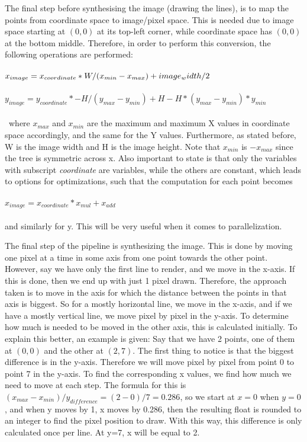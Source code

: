 The final step before synthesising the image (drawing the lines), is to map the points from coordinate space to image/pixel space. This is needed due to image space starting at $(0, 0)$ at its top-left corner, while coordinate space has $(0,0)$ at the bottom middle. Therefore, in order to perform this conversion, the following operations are performed: 
\\ \\
$x_{image} = \\ x_{coordinate} * W / (x_{min} - x_{max}) + image_width/2$
\\ \\
$y_{image} = y_{coordinate} * - H / (y_{max} - y_{min}) + H - H*(y_{max}-y_{min}) * y_{min}$
\\ \\\
where $x_{max}$ and $x_{min}$ are the maximum and maximum X values in coordinate space accordingly, and the same for the Y values. Furthermore, as stated before, W is the image width and H is the image height. Note that $x_{min}$ is $-x_{max}$ since the tree is symmetric across x. Also important to state is that only the variables with subscript \textit{coordinate} are variables, while the others are constant, which leads to options for optimizations, such that the computation for each point becomes
\\ \\
$x_{image} = x_{coordinate} * x_{mul} + x_{add}$
\\ \\
and similarly for y. This will be very useful when it comes to parallelization.

The final step of the pipeline is synthesizing the image. This is done by moving one pixel at a time in some axis from one point towards the other point. However, say we have only the first line to render, and we move in the x-axis. If this is done, then we end up with just 1 pixel drawn. Therefore, the approach taken is to move in the axis for which the distance between the points in that axis is biggest. So for a mostly horizontal line, we move in the x-axis, and if we have a mostly vertical line, we move pixel by pixel in the y-axis. To determine how much is needed to be moved in the other axis, this is calculated initially. To explain this better, an example is given: Say that we have 2 points, one of them at $(0, 0)$ and the other at $(2, 7)$. The first thing to notice is that the biggest difference is in the y-axis. Therefore we will move pixel by pixel from point 0 to point 7 in the y-axis. To find the corresponding x values, we find how much we need to move at each step. The formula for this is $(x_{max}-x_{min})/y_{difference} = (2-0)/7 = 0.286$, so we start at $x=0$ when $y=0$, and when y moves by 1, x moves by 0.286, then the resulting float is rounded to an integer to find the pixel position to draw. With this way, this difference is only calculated once per line. At y=7, x will be equal to 2.

